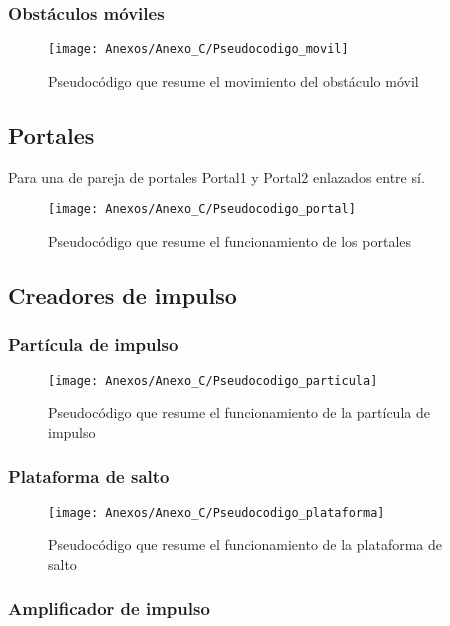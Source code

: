 \subsubsection{Obstáculos móviles}

\begin{figure}[h]
\centering
\texttt{[image: Anexos/Anexo\_C/Pseudocodigo\_movil]}
\caption{Pseudocódigo que resume el movimiento del obstáculo móvil}
\end{figure}

\subsection{Portales}
Para una de pareja de portales Portal1 y Portal2 enlazados entre sí.

\begin{figure}[h]
\centering
\texttt{[image: Anexos/Anexo\_C/Pseudocodigo\_portal]}
\caption{Pseudocódigo que resume el funcionamiento de los portales}
\end{figure}
\clearpage

\subsection{Creadores de impulso}
\subsubsection{Partícula de impulso}

\begin{figure}[h]
\centering
\texttt{[image: Anexos/Anexo\_C/Pseudocodigo\_particula]}
\caption{Pseudocódigo que resume el funcionamiento de la partícula de impulso}
\end{figure}

\subsubsection{Plataforma de salto}

\begin{figure}[h]
\centering
\texttt{[image: Anexos/Anexo\_C/Pseudocodigo\_plataforma]}
\caption{Pseudocódigo que resume el funcionamiento de la plataforma de salto}
\end{figure}

\subsubsection{Amplificador de impulso}

